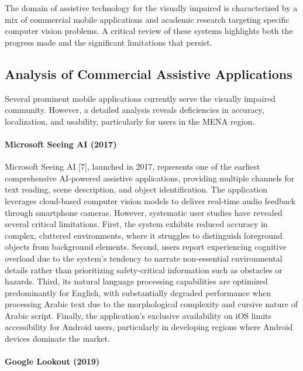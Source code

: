 \documentclass[12pt,a4paper]{report}
\begin{document}
The domain of assistive technology for the visually impaired is characterized by a mix of commercial mobile applications and academic research targeting specific computer vision problems. A critical review of these systems highlights both the progress made and the significant limitations that persist.

\subsection{Analysis of Commercial Assistive Applications}

Several prominent mobile applications currently serve the visually impaired community. However, a detailed analysis reveals deficiencies in accuracy, localization, and usability, particularly for users in the MENA region.

\paragraph*{Microsoft Seeing AI (2017)}

Microsoft Seeing AI [7], launched in 2017, represents one of the earliest comprehensive AI-powered assistive applications, providing multiple channels for text reading, scene description, and object identification. The application leverages cloud-based computer vision models to deliver real-time audio feedback through smartphone cameras. However, systematic user studies have revealed several critical limitations. First, the system exhibits reduced accuracy in complex, cluttered environments, where it struggles to distinguish foreground objects from background elements. Second, users report experiencing cognitive overload due to the system's tendency to narrate non-essential environmental details rather than prioritizing safety-critical information such as obstacles or hazards. Third, its natural language processing capabilities are optimized predominantly for English, with substantially degraded performance when processing Arabic text due to the morphological complexity and cursive nature of Arabic script. Finally, the application's exclusive availability on iOS limits accessibility for Android users, particularly in developing regions where Android devices dominate the market.

\paragraph*{Google Lookout (2019)}
\end{document}
